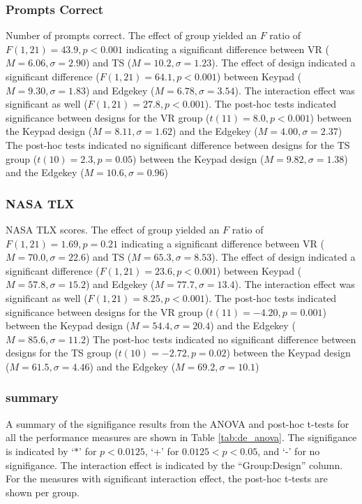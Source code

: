 \subsubsection{Prompts Correct}

Number of prompts correct.
The effect of group yielded an $F$ ratio of $F(1, 21) = 43.9, p < 0.001$ indicating a significant difference between VR ($M = 6.06, \sigma = 2.90$) and TS ($M = 10.2, \sigma = 1.23$).
The effect of design indicated a significant difference ($F(1, 21) = 64.1, p < 0.001$) between Keypad ($M = 9.30, \sigma=1.83$) and Edgekey ($M=6.78, \sigma=3.54$).
The interaction effect was significant as well ($F(1, 21) = 27.8, p < 0.001$).
The post-hoc tests indicated significance between designs for the VR group ($t(11) = 8.0, p < 0.001$) between the Keypad design ($M = 8.11, \sigma = 1.62$) and the Edgekey ($M = 4.00, \sigma = 2.37$)
The post-hoc tests indicated no significant difference between designs for the TS group ($t(10) = 2.3, p = 0.05$) between the Keypad design ($M = 9.82, \sigma = 1.38$) and the Edgekey ($M = 10.6, \sigma = 0.96$)

\subsubsection{NASA TLX}

NASA TLX scores.
The effect of group yielded an $F$ ratio of $F(1, 21) = 1.69, p = 0.21$ indicating a significant difference between VR ($M = 70.0, \sigma = 22.6$) and TS ($M = 65.3, \sigma = 8.53$).
The effect of design indicated a significant difference ($F(1, 21) = 23.6, p < 0.001$) between Keypad ($M = 57.8, \sigma=15.2$) and Edgekey ($M=77.7, \sigma=13.4$).
The interaction effect was significant as well ($F(1, 21) = 8.25, p < 0.001$).
The post-hoc tests indicated significance between designs for the VR group ($t(11) = -4.20, p = 0.001$) between the Keypad design ($M = 54.4, \sigma = 20.4$) and the Edgekey ($M = 85.6, \sigma = 11.2$)
The post-hoc tests indicated no significant difference between designs for the TS group ($t(10) = -2.72, p = 0.02$) between the Keypad design ($M = 61.5, \sigma = 4.46$) and the Edgekey ($M = 69.2, \sigma = 10.1$)

\subsubsection{summary}

A summary of the signifigance results from the ANOVA and post-hoc t-tests for all the performance measures are shown in Table \ref{tab:de_anova}.
The signifigance is indicated by `$*$' for $p<0.0125$, `+' for $0.0125<p<0.05$, and `-' for no signifigance.
The interaction effect is indicated by the ``Group:Design'' column.
For the measures with significant interaction effect, the post-hoc t-tests are shown per group.

